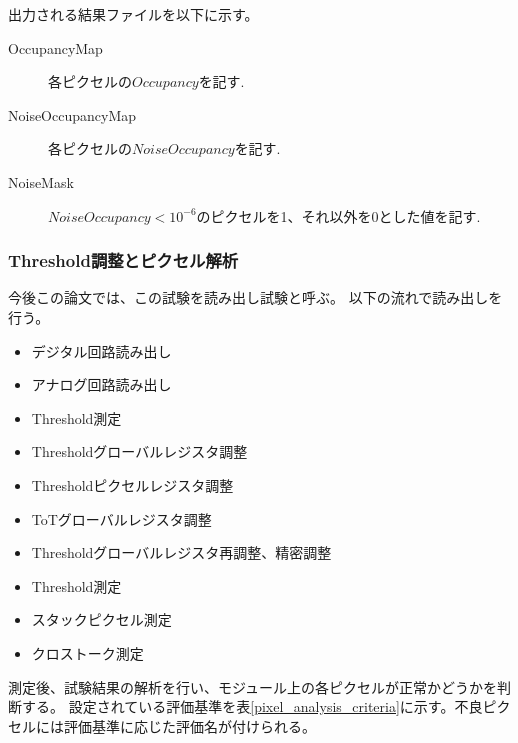 出力される結果ファイルを以下に示す。
\begin{description}
  \item [OccupancyMap] 各ピクセルの$Occupancy$を記す.
  \item [NoiseOccupancyMap] 各ピクセルの$NoiseOccupancy$を記す.
  \item [NoiseMask] $NoiseOccupancy < 10^{-6}$のピクセルを1、それ以外を0とした値を記す.
\end{description}
  
\subsubsection{Threshold調整とピクセル解析}\label{sec:pixel_analysis}
今後この論文では、この試験を読み出し試験と呼ぶ。
以下の流れで読み出しを行う。
\begin{itemize}
  \item デジタル回路読み出し
  \item アナログ回路読み出し
  \item Threshold測定
  \item Thresholdグローバルレジスタ調整
  \item Thresholdピクセルレジスタ調整
  \item ToTグローバルレジスタ調整
  \item Thresholdグローバルレジスタ再調整、精密調整
  \item Threshold測定
  \item スタックピクセル測定
  \item クロストーク測定
\end{itemize}

測定後、試験結果の解析を行い、モジュール上の各ピクセルが正常かどうかを判断する。
設定されている評価基準を表\ref{pixel_analysis_criteria}に示す。不良ピクセルには評価基準に応じた評価名が付けられる。

